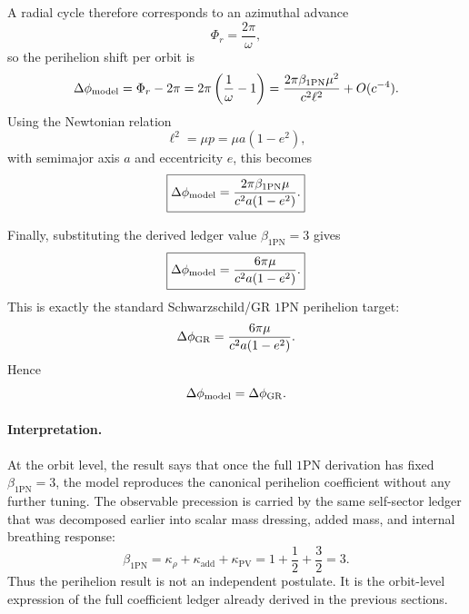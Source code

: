 \documentclass[11pt]{article}
\newcommand{\kadd}{\kappa_{\mathrm{add}}}
\newcommand{\kPV}{\kappa_{\mathrm{PV}}}
\newcommand{\krho}{\kappa_{\rho}}
\newcommand{\betaPN}{\beta_{\mathrm{1PN}}}
\begin{document}
A radial cycle therefore corresponds to an azimuthal advance
\begin{equation}
\Phi_r=\frac{2\pi}{\omega},
\end{equation}
so the perihelion shift per orbit is
\begin{equation}
\Delta\phi_{\rm model}
=
\Phi_r-2\pi
=
2\pi\left(\frac{1}{\omega}-1\right)
=
\frac{2\pi\betaPN\mu^2}{c^2\ell^2}
+O(c^{-4}).
\label{eq:deltaphi-in-ell}
\end{equation}
Using the Newtonian relation
\begin{equation}
\ell^2=\mu p=\mu a(1-e^2),
\label{eq:newtonian-ell-p}
\end{equation}
with semimajor axis \(a\) and eccentricity \(e\), this becomes
\begin{equation}
\boxed{
\Delta\phi_{\rm model}
=
\frac{2\pi\betaPN\mu}{c^2 a(1-e^2)}.
}
\label{eq:deltaphi-model}
\end{equation}

Finally, substituting the derived ledger value \(\betaPN=3\) gives
\begin{equation}
\boxed{
\Delta\phi_{\rm model}
=
\frac{6\pi\mu}{c^2 a(1-e^2)}.
}
\label{eq:deltaphi-model-beta3}
\end{equation}
This is exactly the standard Schwarzschild/GR \(1\)PN perihelion target:
\begin{equation}
\Delta\phi_{\rm GR}
=
\frac{6\pi\mu}{c^2 a(1-e^2)}.
\label{eq:deltaphi-gr}
\end{equation}
Hence
\begin{equation}
\Delta\phi_{\rm model}=\Delta\phi_{\rm GR}.
\label{eq:deltaphi-equality}
\end{equation}

\paragraph{Interpretation.}
At the orbit level, the result says that once the full \(1\)PN derivation has fixed
\(\betaPN=3\), the model reproduces the canonical perihelion coefficient without any
further tuning. The observable precession is carried by the same self-sector ledger that
was decomposed earlier into scalar mass dressing, added mass, and internal breathing
response:
\begin{equation}
\betaPN
=
\krho+\kadd+\kPV
=
1+\frac12+\frac32
=
3.
\end{equation}
Thus the perihelion result is not an independent postulate. It is the orbit-level
expression of the full coefficient ledger already derived in the previous sections.
\end{document}
